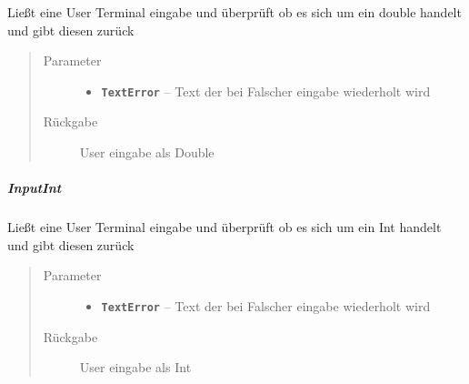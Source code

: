 \documentclass[letterpaper,10pt,ngerman]{sphinxmanual}
\begin{document}
\begin{fulllineitems}
\label{com/linuxluigi/polynomial/TerminalInterface:com.linuxluigi.polynomial.TerminalInterface.InputDouble(String)}
Ließt eine User Terminal eingabe und überprüft ob es sich um ein double handelt und gibt diesen zurück
\begin{quote}\begin{description}
\item[{Parameter}] \leavevmode\begin{itemize}
\item {} 
\textbf{\texttt{TextError}} -- Text der bei Falscher eingabe wiederholt wird

\end{itemize}

\item[{Rückgabe}] \leavevmode
User eingabe als Double

\end{description}\end{quote}

\end{fulllineitems}



\subparagraph{InputInt}
\label{com/linuxluigi/polynomial/TerminalInterface:inputint}

\begin{fulllineitems}
\label{com/linuxluigi/polynomial/TerminalInterface:com.linuxluigi.polynomial.TerminalInterface.InputInt(String)}
Ließt eine User Terminal eingabe und überprüft ob es sich um ein Int handelt und gibt diesen zurück
\begin{quote}\begin{description}
\item[{Parameter}] \leavevmode\begin{itemize}
\item {} 
\textbf{\texttt{TextError}} -- Text der bei Falscher eingabe wiederholt wird

\end{itemize}

\item[{Rückgabe}] \leavevmode
User eingabe als Int

\end{description}\end{quote}

\end{fulllineitems}
\end{document}
